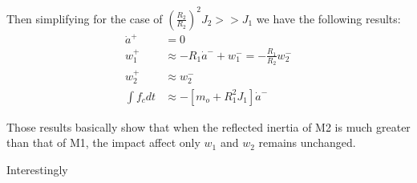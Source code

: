 Then simplifying for the case of $(\frac{R_2}{R_2})^2 J_2 >> J_1 $ we have the following results:
%
\begin{align}
\dot{a}^+ &= 0 \\
w_1^+     &\approx - R_1 \dot{a}^- + w_1^-  = - \frac{R_1}{R_2} w_2^- \\
w_2^+     &\approx  w_2^- \\
\int{f_c dt}     &\approx -[m_o + R_1^2 J_1] \dot{a}^-
\label{eq:dsdm_impact_res}
\end{align}
%

Those results basically show that when the reflected inertia of M2 is much greater than that of M1, the impact affect only $w_1$ and $w_2$ remains unchanged. 

Interestingly 

